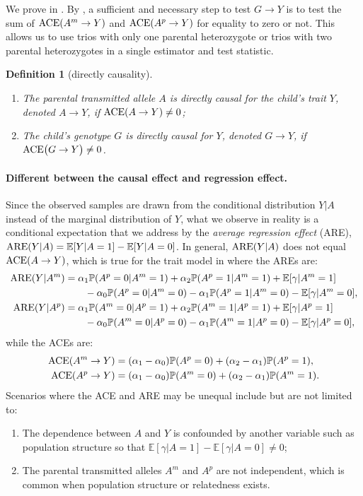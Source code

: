 \documentclass[12pt]{extarticle}
\newtheorem{defin}{Definition}%
\newcommand{\pp}{\mathbb{P}}
\newcommand{\E}{\mathbb{E}}
\newcommand{\ace}{{\normalfont \text{ACE}}}
\newcommand{\are}{{\normalfont \text{ARE}}}
\begin{document}
\noindent We prove  in . By , a sufficient and necessary step to test $G\to Y$ is to test the sum of $\ace(A^m\to Y)$ and $\ace(A^p\to Y)$ for equality to zero or not. This allows us to use trios with only one parental heterozygote or trios with two parental heterozygotes in a single estimator and test statistic.

\begin{defin}[directly causality]\label{def:direct_causality}
\begin{enumerate}
\item[(A)] The parental transmitted allele $A$ is directly causal for the child's trait $Y$, denoted $A\to Y$, if $\ace(A\to Y)\neq 0$; 
\item[(B)] The child's genotype $G$ is directly causal for $Y$, denoted $G\to Y$, if $\ace\big(G \to Y\big)\neq 0$.
\end{enumerate}
\end{defin}

\paragraph{Different between the causal effect and regression effect.} Since the observed samples are drawn from the conditional distribution $Y|A$ instead of the marginal distribution of $Y$, what we observe in reality is a conditional expectation that we address by the \textit{average regression effect} (ARE), $\are (Y|A) = \mathbb{E}[Y|A=1]-\mathbb{E}[Y|A=0]$. In general, $\are(Y|A)$ does not equal $\ace(A\to Y)$, which is true for the trait model in  where the AREs are: 
\begin{align*}
\are(Y|A^m) &= \alpha_1\pp(A^p=0|A^m=1) + \alpha_2\pp(A^p=1|A^m=1) + \E[\gamma|A^m=1] \\
& \qquad - \alpha_0\pp(A^p=0|A^m=0)-\alpha_1\pp(A^p=1|A^m=0) - \E[\gamma|A^m=0], \\
\are(Y|A^p) &= \alpha_1\pp(A^m=0|A^p=1) + \alpha_2\pp(A^m=1|A^p=1) + \E[\gamma|A^p=1]  \\
& \qquad - \alpha_0\pp(A^m=0|A^p=0)-\alpha_1\pp(A^m=1|A^p=0) - \E[\gamma|A^p=0],
\end{align*} while the ACEs are: 
\begin{align*}
\ace(A^m\to Y) &= (\alpha_1-\alpha_0)\pp(A^p=0) + (\alpha_2-\alpha_1)\pp(A^p=1), \\
\ace(A^p\to Y) &= (\alpha_1-\alpha_0)\pp(A^m=0) + (\alpha_2-\alpha_1)\pp(A^m=1).
\end{align*} Scenarios where the ACE and ARE may be unequal include but are not limited to: \begin{enumerate}
\item[(A)] The dependence between $A$ and $Y$ is confounded by another variable such as population structure so that $\E[\gamma|A=1]- \E[\gamma|A=0]\neq 0$;
\item[(B)] The parental transmitted alleles $A^m$ and $A^p$ are not independent, which is common when population structure or relatedness exists.
\end{enumerate} 
\end{document}
